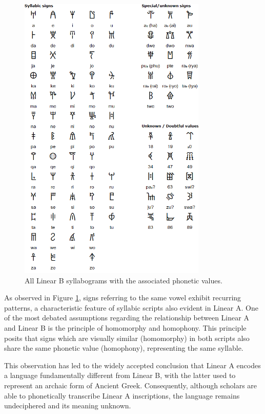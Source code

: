 \begin{figure}[H]
\centering
\includegraphics[width=0.8\textwidth]{Images/syll_LB.png}
\caption{All Linear B syllabograms with the associated phonetic values.}
\label{fig:syll_LB}
\end{figure}

As observed in Figure \ref{fig:syll_LB}, signs referring to the same vowel exhibit recurring patterns, a characteristic feature of syllabic scripts also evident in Linear A.
One of the most debated assumptions regarding the relationship between Linear A and Linear B is the principle of homomorphy and homophony.
This principle posits that signs which are visually similar (homomorphy) in both scripts also share the same phonetic value (homophony), representing the same syllable. \cite{salg-ch1}

This observation has led to the widely accepted conclusion that Linear A encodes a language fundamentally different from Linear B, with the latter used to represent an archaic form of Ancient Greek.
Consequently, although scholars are able to phonetically transcribe Linear A inscriptions, the language remains undeciphered and its meaning unknown. 

